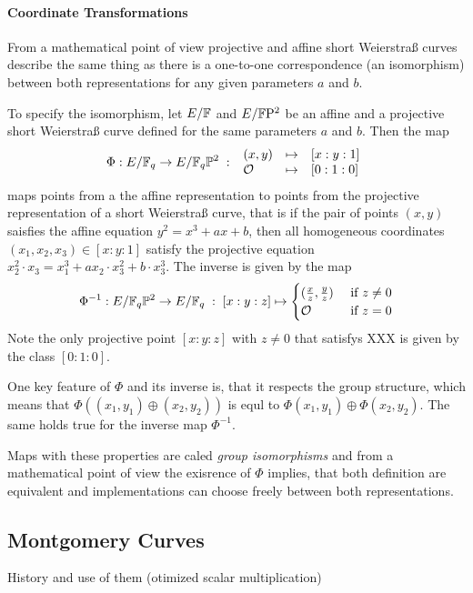 \paragraph{Coordinate Transformations}
From a mathematical point of view projective and affine short Weierstraß curves describe the same thing as there is a one-to-one correspondence (an isomorphism) between both representations for any given parameters $a$ and $b$. 

To specify the isomorphism, let $E/\mathbb{F}$ and $E/\mathbb{F}\mathrm{P}^2$ be an affine and a projective short Weierstraß curve defined for the same parameters $a$ and $b$. Then the map
\begin{equation}
\Phi : E/\mathbb{F}_q \to E/\mathbb{F}_q\mathbb{P}^2\;:\;
\begin{array}{lcl}
(x,y)       &\mapsto & [x:y:1]\\
\mathcal{O} &\mapsto & [0:1:0]
\end{array}
\end{equation}
maps points from a the affine representation to points from the projective representation of a short Weierstraß curve, that is if the pair of points $(x,y)$ saisfies the affine equation $y^2= x^3 + ax + b$, then all homogeneous coordinates $(x_1,x_2,x_3)\in [x:y:1]$ satisfy the projective equation $x_2^2\cdot x_3= x_1^3 + ax_2\cdot x_3^2 + b\cdot x_3^3$. The inverse is given by the map
\begin{equation}
\Phi^{-1} : E/\mathbb{F}_q\mathbb{P}^2\to E/\mathbb{F}_q \;:\; [x:y:z] \mapsto \begin{cases}
(\frac{x}{z},\frac{y}{z}) & \text{ if } z\neq 0\\
\mathcal{O} & \text{ if } z=0
\end{cases}
\end{equation}
Note the only projective point $[x:y:z]$ with $z\neq 0$ that satisfys XXX is given by the class $[0:1:0]$. 

One key feature of $\Phi$ and its inverse is, that it respects the group structure, which means that $\Phi((x_1,y_1)\oplus (x_2,y_2))$ is equl to $\Phi(x_1,y_1)\oplus \Phi(x_2,y_2)$. The same holds true for the inverse map $\Phi^{-1}$.

Maps with these properties are caled \textit{group isomorphisms} and from a mathematical point of view the exisrence of $\Phi$ implies, that both definition are equivalent and implementations can choose freely between both representations. 

\subsection{Montgomery Curves}
History and use of them (otimized scalar multiplication)

